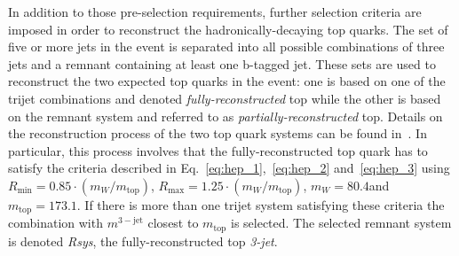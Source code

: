 In addition to those pre-selection requirements, further selection criteria are imposed in order to reconstruct the hadronically-decaying top quarks. The set of five or more jets in the event is separated into all possible combinations of three jets and a remnant containing at least one b-tagged jet. These sets are used to reconstruct the two expected top quarks in the event: one is based on one of the trijet combinations and denoted \textit{fully-reconstructed} top while the other is based on the remnant system and referred to as \textit{partially-reconstructed} top. Details on the reconstruction process of the two top quark systems can be found in~\cite{CMS-PAS-SUS-13-015}. In particular, this process involves that the fully-reconstructed top quark has to satisfy the criteria described in Eq.~\ref{eq:hep_1},~\ref{eq:hep_2} and~\ref{eq:hep_3} using $R_\mathrm{min} = 0.85 \cdot (m_W/m_\mathrm{top})$, $R_\mathrm{max} = 1.25 \cdot (m_W/m_\mathrm{top})$, $m_W = 80.4$\gev and $m_\mathrm{top} = 173.1$\gev. If there is more than one trijet system satisfying these criteria the combination with $m^{3-\mathrm{jet}}$ closest to $m_\mathrm{top}$ is selected. The selected remnant system is denoted \textit{Rsys}, the fully-reconstructed top \textit{3-jet}. 
